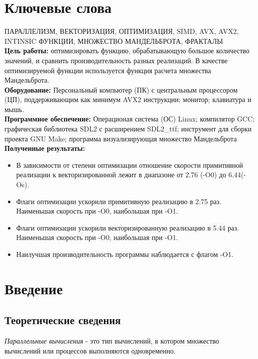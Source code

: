 \documentclass[a4paper, 12pt]{article}
\begin{document}



\section*{Ключевые слова}
\noindent \MakeUppercase{параллелизм, векторизация, оптимизация, SIMD, AVX, AVX2, intinsic функции, множество мандельброта, фракталы}\\

\textbf{Цель работы:} оптимизировать функцию, обрабатывающую большое количество значений, и сравнить производительность разных реализаций. В качестве оптимизируемой функции используется функция расчета множества Мандельброта. \\

\textbf{Оборудование:} Персональный компьютер (ПК) с центральным процессором (ЦП), поддерживающим как минимум AVX2 инструкции; монитор; клавиатура и мышь. \\

\textbf{Программное обеспечение:} Операционая система (ОС) Linux; компилятор GCC; графическая библиотека SDL2 с расширением SDL2\_ttf; инструмент для сборки проекта GNU Make; программа визуализирующая множество Мандельброта\\

\textbf{Полученные результаты:} 
\begin{itemize}
    \item В зависимости от степени оптимизации отношение скорости примитивной реализации к векторизированной лежит в диапазоне от 2.76 (-O0) до 6.44(-Os).
    \item Флаги оптимизации ускорили примитивную реализацию в 2.75 раз. Наименьшая скорость при -O0, наибольшая при -O1.
    \item Флаги оптимизации ускорили векторизированную реализацию в 5.44 раз. Наименьшая скорость при -O0, наибольшая при -O1.
    \item Наилучшая производительность программы наблюдается с флагом -O1.
\end{itemize}
\newpage

\section*{Введение}
\subsection*{Теоретические сведения}

\textit{Параллельные вычисления} - это тип вычислений, в котором множество вычислений или процессов выполняются одновременно. 
\end{document}
